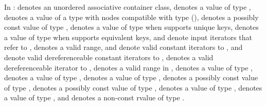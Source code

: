\pnum
{}%
%
%
%
%
%
In :
 denotes an unordered associative container class,
 denotes a value of type ,
 denotes a value of a type with nodes compatible with type
 (),
 denotes a possibly const value of type ,
 denotes a value of type  when  supports unique keys,
 denotes a value of type  when  supports equivalent keys,
 and  denote input iterators that refer to ,
\tcode{[i, j)} denotes a valid range,
 and  denote valid constant iterators to ,
 and  denote valid dereferenceable constant iterators to ,
 denotes a valid dereferenceable iterator to ,
\tcode{[q1, q2)} denotes a valid range in ,
 denotes a value of type ,
 denotes a value of type ,
 denotes a value of type ,
 denotes a possibly const value of type ,
 denotes a possibly const value of type ,
 denotes a value of type ,
 denotes a value of type ,
and  denotes a non-const rvalue of type .

\newcommand{\indexunordmem}[1]{%
\indexlibrary{\idxcode{#1}!unordered associative containers}%
\indexlibrary{\idxcode{unordered_set}!\idxcode{#1}}%
\indexlibrary{\idxcode{unordered_map}!\idxcode{#1}}%
\indexlibrary{\idxcode{unordered_multiset}!\idxcode{#1}}%
\indexlibrary{\idxcode{unordered_multimap}!\idxcode{#1}}%
}

